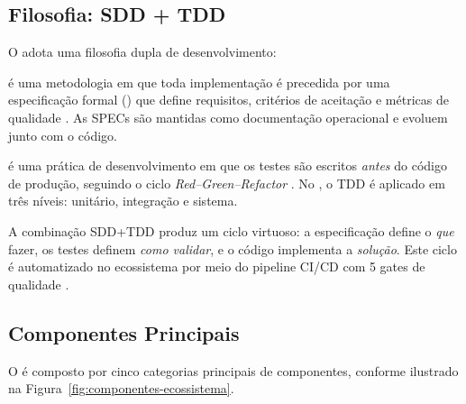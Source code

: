 \subsection{Filosofia: SDD + TDD}
\label{subsec:filosofia}

O \opencodeeco{} adota uma filosofia dupla de desenvolvimento:

\begin{definicao}
\sdd{} é uma metodologia em que toda implementação é precedida por uma
especificação formal () que define requisitos, critérios
de aceitação e métricas de qualidade \cite{sommerville2011engenharia,
pressman2016engenharia}. As SPECs são mantidas como documentação
operacional e evoluem junto com o código.
\end{definicao}

\begin{definicao}
\tdd{} é uma prática de desenvolvimento em que os testes são escritos
\emph{antes} do código de produção, seguindo o ciclo
\emph{Red--Green--Refactor} \cite{beck2002tdd}. No \opencodeeco{}, o TDD
é aplicado em três níveis: unitário, integração e sistema.
\end{definicao}

A combinação SDD+TDD produz um ciclo virtuoso: a especificação define o
\emph{que} fazer, os testes definem \emph{como validar}, e o código
implementa a \emph{solução}. Este ciclo é automatizado no ecossistema por
meio do pipeline CI/CD com 5 gates de qualidade
\cite{opencode2026ecosystem}.

\subsection{Componentes Principais}
\label{subsec:componentes}

O \opencodeeco{} é composto por cinco categorias principais de componentes,
conforme ilustrado na Figura~\ref{fig:componentes-ecossistema}.

